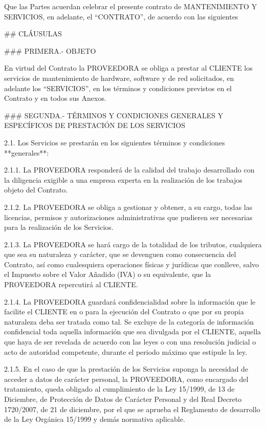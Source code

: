 Que las Partes acuerdan celebrar el presente contrato de MANTENIMIENTO Y SERVICIOS,
en adelante, el “CONTRATO”, de acuerdo con las siguientes 


## CLÁUSULAS

### PRIMERA.- OBJETO

En virtud del Contrato la PROVEEDORA se obliga a prestar al CLIENTE los servicios de mantenimiento de hardware, software y de red solicitados, en adelante los “SERVICIOS”, en los términos y condiciones previstos en el Contrato y en todos sus Anexos.



### SEGUNDA.- TÉRMINOS Y CONDICIONES GENERALES Y ESPECÍFICOS DE PRESTACIÓN DE LOS SERVICIOS

2.1. Los Servicios se prestarán en los siguientes términos y condiciones **generales**:

2.1.1. La PROVEEDORA responderá de la calidad del trabajo desarrollado con la diligencia exigible a una empresa experta en la realización de los trabajos objeto del Contrato.

2.1.2. La PROVEEDORA se obliga a gestionar y obtener, a su cargo, todas las licencias, permisos y autorizaciones administrativas que pudieren ser necesarias para la realización de los Servicios. 

2.1.3. La PROVEEDORA se hará cargo de la totalidad de los tributos, cualquiera que sea su naturaleza y carácter, que se devenguen como consecuencia del Contrato, 
así como cualesquiera operaciones físicas y jurídicas que conlleve, salvo el Impuesto sobre el Valor Añadido (IVA) o su equivalente, que la PROVEEDORA repercutirá al CLIENTE.

2.1.4. La PROVEEDORA guardará confidencialidad sobre la información que le facilite el CLIENTE en o para la ejecución del Contrato o que por su propia naturaleza deba ser tratada como tal.
Se excluye de la categoría de información confidencial toda aquella información que sea divulgada por el CLIENTE,
aquella que haya de ser revelada de acuerdo con las leyes o con una resolución judicial o acto de autoridad competente, durante el periodo máximo que estipule la ley.

2.1.5. En el caso de que la prestación de los Servicios suponga la necesidad de acceder a datos de carácter personal,
la PROVEEDORA, como encargado del tratamiento, queda obligado al cumplimiento de la Ley 15/1999,
de 13 de Diciembre, de Protección de Datos de Carácter Personal y del Real Decreto 1720/2007, de 21 de diciembre,
por el que se aprueba el Reglamento de desarrollo de la Ley Orgánica 15/1999 y demás normativa aplicable.

